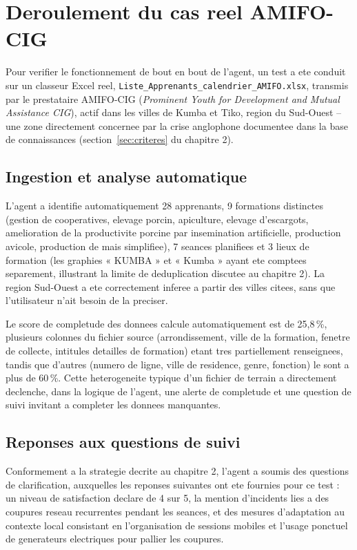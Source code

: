\documentclass[12pt,a4paper,twoside,openany]{report}
\begin{document}
\section{Deroulement du cas reel AMIFO-CIG}

Pour verifier le fonctionnement de bout en bout de l'agent, un test a ete conduit sur un classeur Excel reel, \texttt{Liste\_Apprenants\_calendrier\_AMIFO.xlsx}, transmis par le prestataire AMIFO-CIG (\textit{Prominent Youth for Development and Mutual Assistance CIG}), actif dans les villes de Kumba et Tiko, region du Sud-Ouest -- une zone directement concernee par la crise anglophone documentee dans la base de connaissances (section~\ref{sec:criteres} du chapitre 2).

\subsection{Ingestion et analyse automatique}

L'agent a identifie automatiquement 28 apprenants, 9 formations distinctes (gestion de cooperatives, elevage porcin, apiculture, elevage d'escargots, amelioration de la productivite porcine par insemination artificielle, production avicole, production de mais simplifiee), 7 seances planifiees et 3 lieux de formation (les graphies « KUMBA » et « Kumba » ayant ete comptees separement, illustrant la limite de deduplication discutee au chapitre 2). La region Sud-Ouest a ete correctement inferee a partir des villes citees, sans que l'utilisateur n'ait besoin de la preciser.

Le score de completude des donnees calcule automatiquement est de 25,8\,\%, plusieurs colonnes du fichier source (arrondissement, ville de la formation, fenetre de collecte, intitules detailles de formation) etant tres partiellement renseignees, tandis que d'autres (numero de ligne, ville de residence, genre, fonction) le sont a plus de 60\,\%. Cette heterogeneite typique d'un fichier de terrain a directement declenche, dans la logique de l'agent, une alerte de completude et une question de suivi invitant a completer les donnees manquantes.

\subsection{Reponses aux questions de suivi}

Conformement a la strategie decrite au chapitre 2, l'agent a soumis des questions de clarification, auxquelles les reponses suivantes ont ete fournies pour ce test : un niveau de satisfaction declare de 4 sur 5, la mention d'incidents lies a des coupures reseau recurrentes pendant les seances, et des mesures d'adaptation au contexte local consistant en l'organisation de sessions mobiles et l'usage ponctuel de generateurs electriques pour pallier les coupures.
\end{document}
